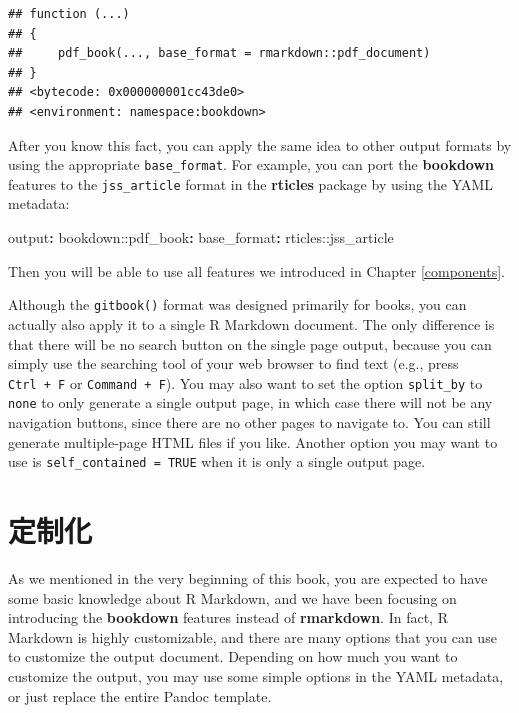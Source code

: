\documentclass[
  12pt,
]{krantz}
\newenvironment{Shaded}{\begin{snugshade}}{\end{snugshade}}
\newcommand{\AttributeTok}[1]{\textcolor[rgb]{0.77,0.63,0.00}{#1}}
\newcommand{\FunctionTok}[1]{\textcolor[rgb]{0.00,0.00,0.00}{#1}}
\newcommand{\KeywordTok}[1]{\textcolor[rgb]{0.13,0.29,0.53}{\textbf{#1}}}
\theoremstyle{definition}
\theoremstyle{definition}
\theoremstyle{definition}
\theoremstyle{definition}
\theoremstyle{remark}
\begin{document}
\begin{verbatim}
## function (...) 
## {
##     pdf_book(..., base_format = rmarkdown::pdf_document)
## }
## <bytecode: 0x000000001cc43de0>
## <environment: namespace:bookdown>
\end{verbatim}

After you know this fact, you can apply the same idea to other output formats by using the appropriate \texttt{base\_format}. For example, you can port the \textbf{bookdown} features to the \texttt{jss\_article} format in the \textbf{rticles} package \citep{R-rticles} by using the YAML metadata:

\begin{Shaded}
\begin{Highlighting}[]
\FunctionTok{output}\KeywordTok{:}
\AttributeTok{  bookdown:}\FunctionTok{:pdf\_book}\KeywordTok{:}
\AttributeTok{    }\FunctionTok{base\_format}\KeywordTok{:}\AttributeTok{ rticles::jss\_article}
\end{Highlighting}
\end{Shaded}

Then you will be able to use all features we introduced in Chapter \ref{components}.

Although the \texttt{gitbook()} format was designed primarily for books, you can actually also apply it to a single R Markdown document. The only difference is that there will be no search button on the single page output, because you can simply use the searching tool of your web browser to find text (e.g., press \texttt{Ctrl\ +\ F} or \texttt{Command\ +\ F}). You may also want to set the option \texttt{split\_by} to \texttt{none} to only generate a single output page, in which case there will not be any navigation buttons, since there are no other pages to navigate to. You can still generate multiple-page HTML files if you like. Another option you may want to use is \texttt{self\_contained\ =\ TRUE} when it is only a single output page.

\hypertarget{customization}{%
\chapter{定制化}\label{customization}}

As we mentioned in the very beginning of this book, you are expected to have some basic knowledge about R Markdown, and we have been focusing on introducing the \textbf{bookdown} features instead of \textbf{rmarkdown}. In fact, R Markdown is highly customizable, and there are many options that you can use to customize the output document. Depending on how much you want to customize the output, you may use some simple options in the YAML metadata, or just replace the entire Pandoc template.
\end{document}
